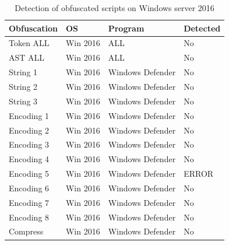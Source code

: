 \documentclass{article}%
\begin{document}
\begin{table}[]
\caption {Detection of obfuscated scripts on Windows server 2016} \label{tab:table_four}
\begin{center}
\begin{tabular}{|l|l|l|l|}
\hline
Obfuscation & OS       & Program          & Detected \\ \hline
Token ALL   & Win 2016 & ALL              & No       \\ \hline
AST ALL     & Win 2016 & ALL              & No       \\ \hline
String 1    & Win 2016 & Windows Defender & No       \\ \hline
String 2    & Win 2016 & Windows Defender & No       \\ \hline
String 3    & Win 2016 & Windows Defender & No       \\ \hline
Encoding 1  & Win 2016 & Windows Defender & No       \\ \hline
Encoding 2  & Win 2016 & Windows Defender & No       \\ \hline
Encoding 3  & Win 2016 & Windows Defender & No       \\ \hline
Encoding 4  & Win 2016 & Windows Defender & No       \\ \hline
Encoding 5  & Win 2016 & Windows Defender & ERROR    \\ \hline
Encoding 6  & Win 2016 & Windows Defender & No       \\ \hline
Encoding 7  & Win 2016 & Windows Defender & No       \\ \hline
Encoding 8  & Win 2016 & Windows Defender & No       \\ \hline
Compress    & Win 2016 & Windows Defender & No       \\ \hline
\end{tabular}
\end{center}
\end{table}
\end{document}
